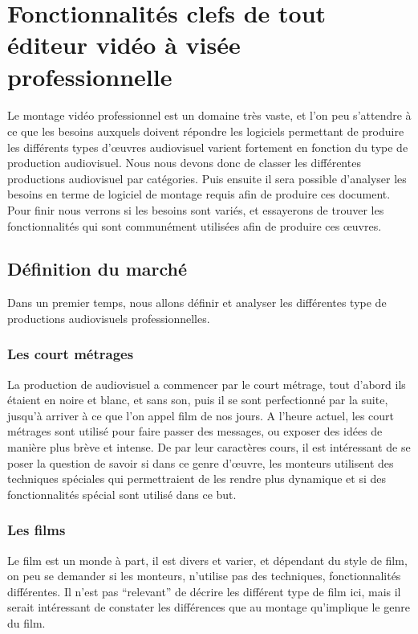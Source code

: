 \newpage
\section{Fonctionnalités clefs de tout éditeur vidéo à visée
  professionnelle}

\paragraph{}
  Le montage vidéo professionnel est un domaine très vaste, et l'on peu
  s'attendre à ce que les besoins auxquels doivent répondre les logiciels
  permettant de produire les différents types d'œuvres audiovisuel
  varient fortement en fonction du type de production audiovisuel. Nous nous
  devons donc de classer les différentes productions audiovisuel par
  catégories. Puis ensuite il sera possible d'analyser les besoins en
  terme de logiciel de montage requis afin de produire ces document. Pour finir
  nous verrons si les besoins sont variés, et essayerons de trouver les
  fonctionnalités qui sont communément utilisées afin de produire ces œuvres.

  \subsection{Définition du marché}
    Dans un premier temps, nous allons définir et analyser les différentes type
    de productions audiovisuels professionnelles.
    \subsubsection {Les court métrages}
      La production de audiovisuel a commencer par le court métrage, tout d'abord ils
      étaient en noire et blanc, et sans son, puis il se sont perfectionné par la suite,
      jusqu'à arriver à ce que l'on appel film de nos jours.
      A l'heure actuel, les court métrages sont utilisé pour faire passer des messages,
      ou exposer des idées de manière plus brève et intense. De par leur caractères
      cours, il est intéressant de se poser la question de savoir si dans ce genre
      d'œuvre, les monteurs utilisent des techniques spéciales qui permettraient
      de les rendre plus dynamique et si des fonctionnalités spécial sont utilisé dans
      ce but.  %
    \subsubsection {Les films}
      Le film est un monde à part, il est divers et varier, et dépendant du style de film,
      on peu se demander si les monteurs, n'utilise pas des techniques, fonctionnalités
      différentes. Il n'est pas ``relevant'' de décrire les différent type de film ici,
      mais il serait intéressant de constater les différences que au montage qu'implique
      le genre du film.

